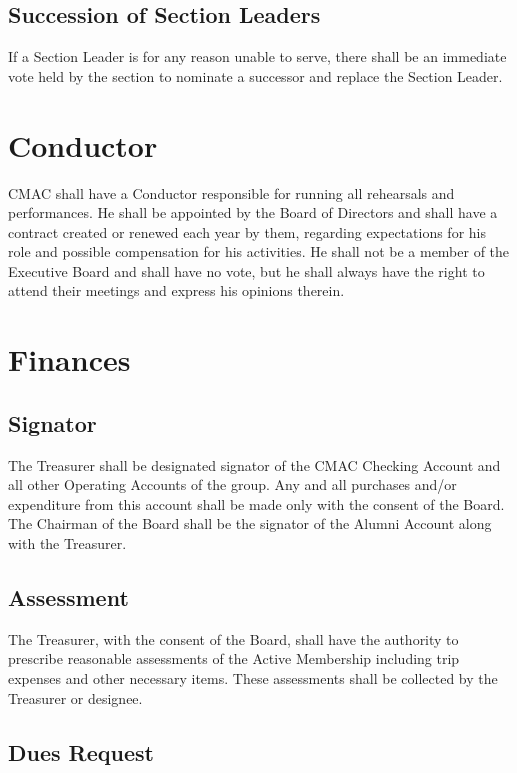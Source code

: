 \documentclass{article}
\begin{document}
\subsection{Succession of Section Leaders}

If a Section Leader is for any reason unable to serve, there shall
be an immediate vote held by the section to nominate a successor and
replace the Section Leader.

\section{Conductor}

CMAC shall have a Conductor responsible for running all rehearsals
and performances. He shall be appointed by the Board of Directors
and shall have a contract created or renewed each year by them, regarding
expectations for his role and possible compensation for his activities.
He shall not be a member of the Executive Board and shall have no
vote, but he shall always have the right to attend their meetings
and express his opinions therein.

\section{Finances}

\subsection{Signator}

The Treasurer shall be designated signator of the CMAC Checking Account
and all other Operating Accounts of the group. Any and all purchases
and/or expenditure from this account shall be made only with the consent
of the Board. The Chairman of the Board shall be the signator of the
Alumni Account along with the Treasurer.

\subsection{Assessment}

The Treasurer, with the consent of the Board, shall have the authority
to prescribe reasonable assessments of the Active Membership including
trip expenses and other necessary items. These assessments shall be
collected by the Treasurer or designee.

\subsection{Dues Request}
\end{document}

